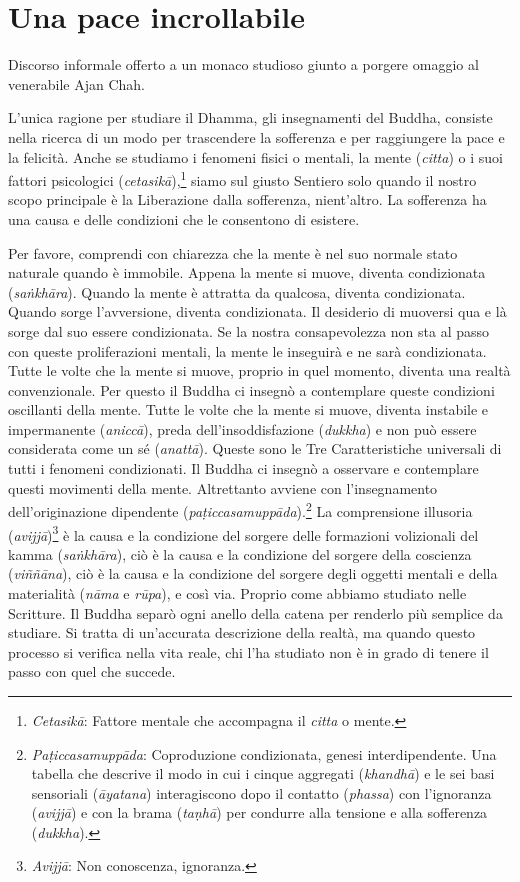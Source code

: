 \chapter{Una pace incrollabile}

\begin{openingQuote}
  \centering

  Discorso informale offerto a un monaco studioso giunto a porgere omaggio al
  venerabile Ajan Chah.
\end{openingQuote}

L'unica ragione per studiare il Dhamma, gli insegnamenti del Buddha,
consiste nella ricerca di un modo per trascendere la sofferenza e per
raggiungere la pace e la felicità. Anche se studiamo i fenomeni fisici o
mentali, la mente (\emph{citta}) o i suoi fattori psicologici
(\emph{cetasikā}),\footnote{\emph{Cetasikā}: Fattore mentale che
  accompagna il \emph{citta} o mente.} siamo sul giusto Sentiero solo
quando il nostro scopo principale è la Liberazione dalla sofferenza,
nient'altro. La sofferenza ha una causa e delle condizioni che le
consentono di esistere.

Per favore, comprendi con chiarezza che la mente è nel suo normale stato
naturale quando è immobile. Appena la mente si muove, diventa
condizionata (\emph{saṅkhāra}). Quando la mente è attratta da qualcosa,
diventa condizionata. Quando sorge l'avversione, diventa condizionata.
Il desiderio di muoversi qua e là sorge dal suo essere condizionata. Se
la nostra consapevolezza non sta al passo con queste proliferazioni
mentali, la mente le inseguirà e ne sarà condizionata. Tutte le volte
che la mente si muove, proprio in quel momento, diventa una realtà
convenzionale. Per questo il Buddha ci insegnò a contemplare queste
condizioni oscillanti della mente. Tutte le volte che la mente si muove,
diventa instabile e impermanente (\emph{aniccā}), preda
dell'insoddisfazione (\emph{dukkha}) e non può essere considerata come
un sé (\emph{anattā}). Queste sono le Tre Caratteristiche universali di
tutti i fenomeni condizionati. Il Buddha ci insegnò a osservare e
contemplare questi movimenti della mente. Altrettanto avviene con
l'insegnamento dell'originazione dipendente
(\emph{paṭiccasamuppāda}).\footnote{\emph{Paṭiccasamuppāda}:
  Coproduzione condizionata, genesi interdipendente. Una tabella che
  descrive il modo in cui i cinque aggregati (\emph{khandhā}) e le sei
  basi sensoriali (\emph{āyatana}) interagiscono dopo il contatto
  (\emph{phassa}) con l'ignoranza (\emph{avijjā}) e con la brama
  (\emph{taṇhā}) per condurre alla tensione e alla sofferenza
  (\emph{dukkha}).} La comprensione illusoria (\emph{avijjā})\footnote{\emph{Avijjā}:
  Non conoscenza, ignoranza.} è la causa e la condizione del sorgere
delle formazioni volizionali del kamma (\emph{saṅkhāra}), ciò è
la causa e la condizione del sorgere della coscienza (\emph{viññāna}),
ciò è la causa e la condizione del sorgere degli oggetti mentali e della
materialità (\emph{nāma} e \emph{rūpa}), e così via. Proprio come
abbiamo studiato nelle Scritture. Il Buddha separò ogni anello della
catena per renderlo più semplice da studiare. Si tratta di un'accurata
descrizione della realtà, ma quando questo processo si verifica nella
vita reale, chi l'ha studiato non è in grado di tenere il passo con quel
che succede.

